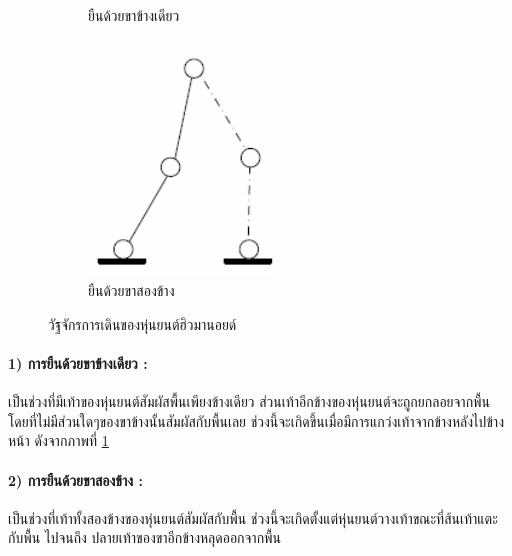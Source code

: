 \begin{figure}[ht]
\begin{subfigure}[b]{0.45\textwidth}
		\caption{ยืนด้วยขาข้างเดียว}
		\label{fig:robot_walk_2}
	\end{subfigure}
	\hfill
	\begin{subfigure}[b]{0.22\textwidth}
		\centering
		\includegraphics[width=\textwidth]{chapter2/images/doublesupport2.png}
		\caption{ยืนด้วยขาสองข้าง}
		\label{fig:robot_walk_3}
	\end{subfigure}
	\caption{วัฐจักรการเดินของหุ่นยนต์ฮิวมานอยด์}
	\label{fig:robot_walk_phase}
\end{figure}

\paragraph*{1) การยืนด้วยขาข้างเดียว :}
เป็นช่วงที่มีเท้าของหุ่นยนต์สัมผัสพื้นเพียงข้างเดียว ส่วนเท้าอีกข้างของหุ่นยนต์จะถูกยกลอยจากพื้น
โดยที่ไม่มีส่วนใดๆของขาข้างนั้นสัมผัสกับพื้นเลย ช่วงนี้จะเกิดขึ้นเมื่อมีการแกว่งเท้าจากข้างหลังไปข้างหน้า
ดังจากภาพที่ \ref{fig:robot_walk_2}

\paragraph*{2) การยืนด้วยขาสองข้าง :}
เป็นช่วงที่เท้าทั้งสองข้างของหุ่นยนต์สัมผัสกับพื้น ช่วงนี้จะเกิดตั้งแต่หุ่นยนต์วางเท้าขณะที่ส้นเท้าแตะกับพื้น
ไปจนถึง ปลายเท้าของขาอีกข้างหลุดออกจากพื้น

